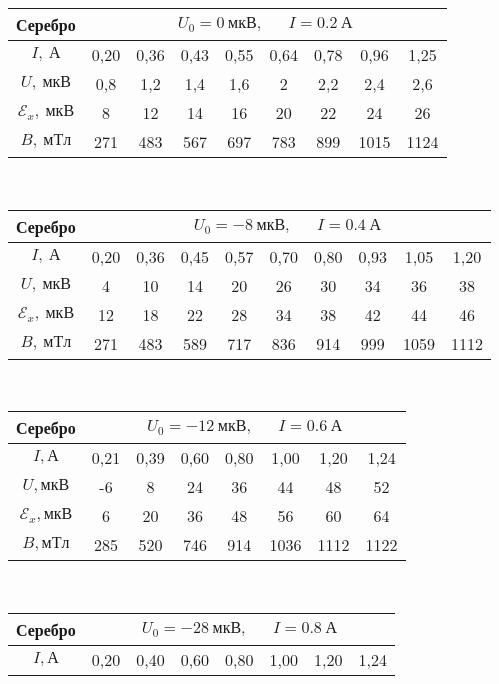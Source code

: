 \documentclass{lab}
\begin{document}
\begin{itemize}
\begin{table}[H]
	\centering
	\renewcommand{\arraystretch}{1.3}
{
	\footnotesize
\begin{tabular}{|c|cccccccc|}
	\hline
	Серебро & \multicolumn{8}{c|}{$ U_0 = 0~мкВ, ~~~~~~~ I = 0.2~А $} \\ \hline
	$ I,~А $	&	0,20	&	0,36	&	0,43	&	0,55	&	0,64	&	0,78	&	0,96	&	1,25	\\ \hline
	$ U,~мкВ $	&	0,8	&	1,2	&	1,4	&	1,6	&	2	&	2,2	&	2,4	&	2,6	\\ \hline
	$ \mathscr{E}_x,~мкВ $	&	8	&	12	&	14	&	16	&	20	&	22	&	24	&	26	\\ \hline
	$ B,~мТл $	&	271	&	483	&	567	&	697	&	783	&	899	&	1015	&	1124	\\ \hline
\end{tabular}
\\[0.1cm]
\begin{tabular}{|c|ccccccccc|}
	\hline
	Серебро & \multicolumn{9}{c|}{$ U_0 = -8~мкВ, ~~~~~~~ I = 0.4~А $} \\ \hline
	$ I,~А $	&	0,20	&	0,36	&	0,45	&	0,57	&	0,70	&	0,80	&	0,93	&	1,05	&	1,20	\\ \hline
	$ U,~мкВ $	&	4	&	10	&	14	&	20	&	26	&	30	&	34	&	36	&	38	\\ \hline
	$ \mathscr{E}_x,~мкВ $	&	12	&	18	&	22	&	28	&	34	&	38	&	42	&	44	&	46	\\ \hline
	$ B,~мТл $	&	271	&	483	&	589	&	717	&	836	&	914	&	999	&	1059	&	1112	\\ \hline
\end{tabular}
\\[0.1cm]
\begin{tabular}{|c|ccccccc|}
	\hline
	Серебро & \multicolumn{7}{c|}{$ U_0 = -12~мкВ, ~~~~~~~ I = 0.6~А $} \\ \hline
	$I, А$	&	0,21	&	0,39	&	0,60	&	0,80	&	1,00	&	1,20	&	1,24	\\ \hline
	$U, мкВ$	&	-6	&	8	&	24	&	36	&	44	&	48	&	52	\\ \hline
	$\mathscr{E}_x, мкВ$	&	6	&	20	&	36	&	48	&	56	&	60	&	64	\\ \hline
	$B, мТл$	&	285	&	520	&	746	&	914	&	1036	&	1112	&	1122	\\ \hline
\end{tabular}
\\[0.1cm]
\begin{tabular}{|c|ccccccc|}
	\hline
	Серебро & \multicolumn{7}{c|}{$ U_0 = -28~мкВ, ~~~~~~~ I = 0.8~А $} \\ \hline
	$I, А$	&	0,20	&	0,40	&	0,60	&	0,80	&	1,00	&	1,20	&	1,24	\\ \hline

\end{tabular}}
\end{table}
\end{itemize}
\end{document}
